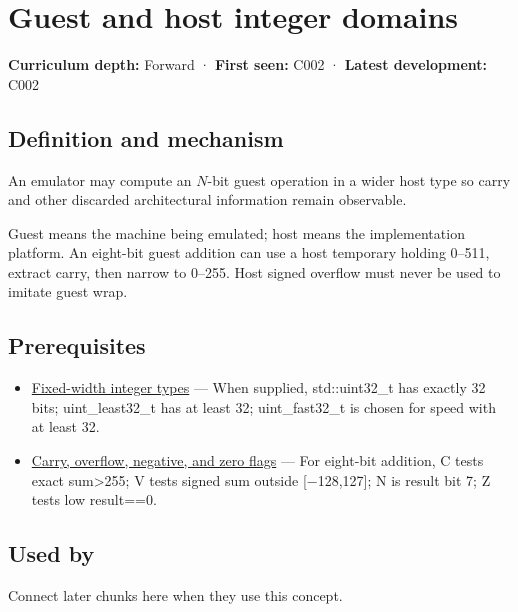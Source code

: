 \hypertarget{appendix-33e7a011b684}{}\label{referencestart:appendix-33e7a011b684}
\section{Guest and host integer domains}\label{appendix-33e7a011b684-guest-and-host-integer-domains}

\textbf{Curriculum depth:} Forward · \textbf{First seen:} C002 · \textbf{Latest development:} C002

\subsection{Definition and mechanism}\label{appendix-33e7a011b684-definition-and-mechanism}

An emulator may compute an \(N\)-bit guest operation in a wider host type so carry and other discarded architectural information remain observable.

Guest means the machine being emulated; host means the implementation platform. An eight-bit guest addition can use a host temporary holding 0--511, extract carry, then narrow to 0--255. Host signed overflow must never be used to imitate guest wrap.

\subsection{Prerequisites}\label{appendix-33e7a011b684-prerequisites}

\begin{itemize}
\tightlist
\item
  \hyperref[appendix-cc04044b5782]{Fixed-width integer types} --- When supplied, std::uint32\_t has exactly 32 bits; uint\_least32\_t has at least 32; uint\_fast32\_t is chosen for speed with at least 32.
\item
  \hyperref[appendix-8d687c9c08ab]{Carry, overflow, negative, and zero flags} --- For eight-bit addition, C tests exact sum\textgreater255; V tests signed sum outside {[}−128,127{]}; N is result bit 7; Z tests low result==0.
\end{itemize}

\subsection{Used by}\label{appendix-33e7a011b684-used-by}

Connect later chunks here when they use this concept.

